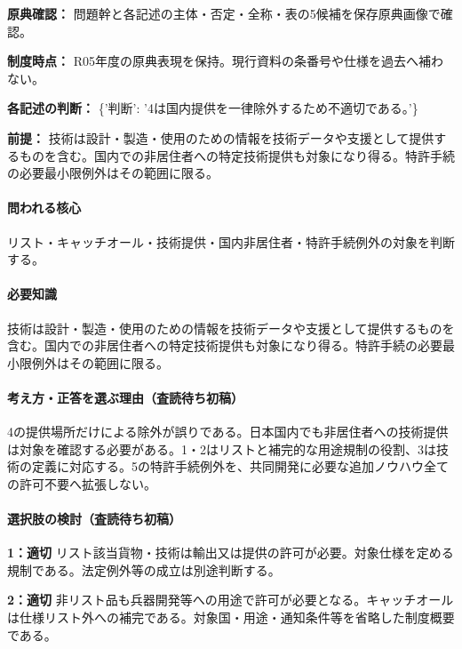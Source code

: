 \noindent\textbf{原典確認：} 問題幹と各記述の主体・否定・全称・表の5候補を保存原典画像で確認。\par

\noindent\textbf{制度時点：} R05年度の原典表現を保持。現行資料の条番号や仕様を過去へ補わない。\par

\noindent\textbf{各記述の判断：} \{'判断': '4は国内提供を一律除外するため不適切である。'\}\par

\noindent\textbf{前提：} 技術は設計・製造・使用のための情報を技術データや支援として提供するものを含む。国内での非居住者への特定技術提供も対象になり得る。特許手続の必要最小限例外はその範囲に限る。\par

\paragraph{問われる核心} リスト・キャッチオール・技術提供・国内非居住者・特許手続例外の対象を判断する。

\paragraph{必要知識} 技術は設計・製造・使用のための情報を技術データや支援として提供するものを含む。国内での非居住者への特定技術提供も対象になり得る。特許手続の必要最小限例外はその範囲に限る。

\paragraph{考え方・正答を選ぶ理由（査読待ち初稿）} 4の提供場所だけによる除外が誤りである。日本国内でも非居住者への技術提供は対象を確認する必要がある。1・2はリストと補完的な用途規制の役割、3は技術の定義に対応する。5の特許手続例外を、共同開発に必要な追加ノウハウ全ての許可不要へ拡張しない。

\paragraph{選択肢の検討（査読待ち初稿）}\mbox{}\par

\noindent\textbf{1：適切} リスト該当貨物・技術は輸出又は提供の許可が必要。対象仕様を定める規制である。法定例外等の成立は別途判断する。\par

\noindent\textbf{2：適切} 非リスト品も兵器開発等への用途で許可が必要となる。キャッチオールは仕様リスト外への補完である。対象国・用途・通知条件等を省略した制度概要である。\par


